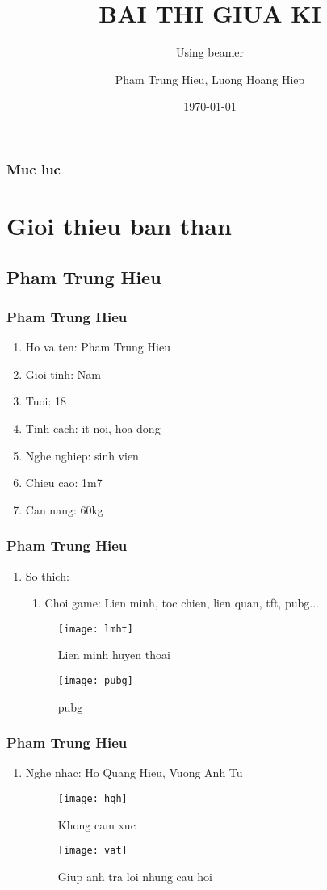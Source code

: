 \documentclass[12pt]{beamer}
\title{BAI THI GIUA KI}
\subtitle{Using beamer}
\author{Pham Trung Hieu, Luong Hoang Hiep}
\institute{ITE6-03}
\date{\today}
\begin{document}
\begin{frame}
\titlepage
\end{frame}
\begin{frame}
\frametitle{Muc luc}
\tableofcontents
\end{frame}
\section{Gioi thieu ban than}
\subsection{Pham Trung Hieu}
\begin{frame}
\frametitle{Pham Trung Hieu}
\begin{enumerate}[1]
\item Ho va ten: Pham Trung Hieu
\item Gioi tinh: Nam
\item Tuoi: 18
\item Tinh cach: it noi, hoa dong 
\item Nghe nghiep: sinh vien 
\item Chieu cao: 1m7
\item Can nang: 60kg
\end{enumerate}
\end{frame}
\begin{frame}
\frametitle{Pham Trung Hieu}
\begin{enumerate}[8]
\item So thich:
\begin{enumerate}[+]
\item Choi game: Lien minh, toc chien, lien quan, tft, pubg...
\end{enumerate}
\begin{figure}
\begin{minipage}{0.4\textwidth}\centerline{\texttt{[image: lmht]}}
\caption{Lien minh huyen thoai}
\end{minipage}
\begin{minipage}{0.5\textwidth}\centerline{\texttt{[image: pubg]}}
\caption{pubg}
\end{minipage}
\end{figure}

\end{enumerate}
\end{frame}
\begin{frame}
\frametitle{Pham Trung Hieu}
\begin{enumerate}[+]
\item Nghe nhac: Ho Quang Hieu, Vuong Anh Tu
\begin{figure}
\begin{minipage}{0.4\textwidth}\centerline{\texttt{[image: hqh]}}
\caption{Khong cam xuc}
\end{minipage}
\begin{minipage}{0.5\textwidth}\centerline{\texttt{[image: vat]}}
\caption{Giup anh tra loi nhung cau hoi}
\end{minipage}
\end{figure}

\end{enumerate}
\end{frame}
\end{document}
